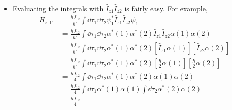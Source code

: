\documentclass[../notes.tex]{subfiles}
\begin{document}
\begin{itemize}
\begin{itemize}
        \item Evaluating the integrals with $\hat{I}_{z1}\hat{I}_{z2}$ is fairly easy. For example,
        \begin{align*}
            H_{z,11} &= \frac{hJ_{12}}{\hbar^2}\int\dd{\tau_1}\dd{\tau_2}\psi_1^*\hat{I}_{z1}\hat{I}_{z2}\psi_1\\
            &= \frac{hJ_{12}}{\hbar^2}\int\dd{\tau_1}\dd{\tau_2}\alpha^*(1)\alpha^*(2)\hat{I}_{z1}\hat{I}_{z2}\alpha(1)\alpha(2)\\
            &= \frac{hJ_{12}}{\hbar^2}\int\dd{\tau_1}\dd{\tau_2}\alpha^*(1)\alpha^*(2)[\hat{I}_{z1}\alpha(1)][\hat{I}_{z2}\alpha(2)]\\
            &= \frac{hJ_{12}}{\hbar^2}\int\dd{\tau_1}\dd{\tau_2}\alpha^*(1)\alpha^*(2)[\tfrac{\hbar}{2}\alpha(1)][\tfrac{\hbar}{2}\alpha(2)]\\
            &= \frac{hJ_{12}}{4}\int\dd{\tau_1}\dd{\tau_2}\alpha^*(1)\alpha^*(2)\alpha(1)\alpha(2)\\
            &= \frac{hJ_{12}}{4}\int\dd{\tau_1}\alpha^*(1)\alpha(1)\int\dd{\tau_2}\alpha^*(2)\alpha(2)\\
            &= \frac{hJ_{12}}{4}
        \end{align*}
    \end{itemize}
\end{itemize}
\end{document}
